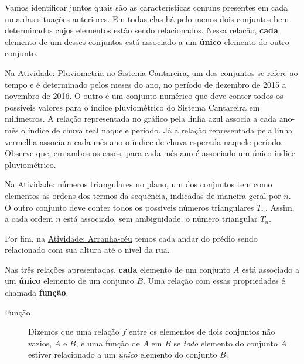 \documentclass[extrafontsizes, twoside, 11pt, openright, final]{memoir}
\begin{document}
\label{\detokenize{AF106-1:sec-funcao-organizando-ideias-conceito}}\label{\detokenize{AF106-1::doc}}\label{\detokenize{AF106-1:organizando-as-ideias-conceito-de-funcao}}
Vamos identificar juntos quais são as características comuns presentes em cada uma das situações anteriores. Em todas elas há pelo menos dois conjuntos bem determinados cujos elementos estão sendo relacionados. Nessa relacão, \textbf{cada} elemento de um desses conjuntos está associado a um \textbf{único} elemento do outro conjunto.

Na {\hyperref[\detokenize{AF106-0:ativ-funcoes-pluviometria}]{Atividade: Pluviometria no Sistema Cantareira}}, um dos conjuntos se refere ao tempo e é determinado pelos meses do ano, no período de dezembro de 2015 a novembro de 2016. O outro é um conjunto numérico que deve conter todos os possíveis valores para o índice pluviométrico do Sistema Cantareira em milímetros. A relação representada no gráfico pela linha azul associa a cada ano-mês o índice de chuva real naquele período. Já a relação representada pela linha vermelha associa a cada mês-ano o índice de chuva esperada naquele período. Observe que, em ambos os casos, para cada mês-ano é associado um único índice pluviométrico.

Na {\hyperref[\detokenize{AF106-4:ativ-funcoes-numeros-triangulares}]{Atividade: números triangulares no plano}}, um dos conjuntos tem como elementos as ordens dos termos da sequência, indicadas de maneira geral por $n$. O outro conjunto deve conter todos os possíveis números triangulares $T_n$. Assim, a cada ordem $n$ está associado, sem ambiguidade, o número triangular $T_n$.

Por fim, na {\hyperref[\detokenize{ativ-arranha}]{Atividade: Arranha-céu}} temos cada andar do prédio sendo relacionado com sua altura até o nível da rua.

Nas três relações apresentadas, \textbf{cada} elemento de um conjunto $A$ está associado a um \textbf{único} elemento de um conjunto $B$. Uma relação com essas propriedades é chamada \textbf{função}.
\begin{description}
	\item[{Função}] \leavevmode{}\label{\detokenize{AF106-1:term-funcao}}
		Dizemos que uma relação $f$ entre os elementos de dois conjuntos não vazios, $A$ e $B$, é uma função de $A$ em $B$ se \emph{todo} elemento do conjunto $A$ estiver relacionado a um \emph{único} elemento do conjunto $B$.

\end{description}
\end{document}

